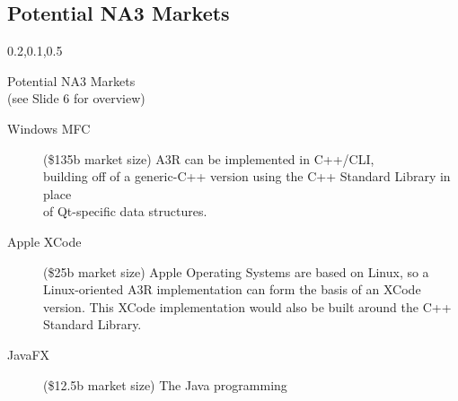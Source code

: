 
\begin{frame}{}
\section{Potential NA3 Markets}

\vspace{-3.5em}	


	
{\Large{}\selectfont
\vspace{1em}
\begin{center}
\begin{minipage}{\textwidth}
\vspace{1em}
{\begin{minipage}{\textwidth}%
\begin{lightquadblockc}{0.2,0.1,0.5}{\parbox{21cm}{\vspace*{10pt}\centering Potential NA3 Markets \\(see Slide 6 for overview)\vspace*{10pt}}}
\hspace{10pt}\begin{minipage}{1.1\textwidth}
{\LARGE {}\selectfont \setlength{\leftmargini}{3pt}\begin{description}
\item[Windows MFC] ({\texttildelow}\$135b market size) A3R can be implemented 
in C++/CLI, \\building off of a generic-C++ version using 
the C++ Standard Library in place \\of Qt-specific data structures.\vspace{10pt} 	
\item[Apple XCode] ({\texttildelow}\$25b market size) Apple Operating Systems 
are based on Linux, so a Linux-oriented A3R implementation can 
form the basis of an XCode version.  This XCode implementation 
would also be built around the C++ Standard Library. \vspace{10pt}
\item[JavaFX] ({\texttildelow}\$12.5b market size)  The Java programming 

\end{description}}
\end{minipage}
\end{lightquadblockc}
\end{minipage}}
\end{minipage}
\end{center}}
\end{frame}

